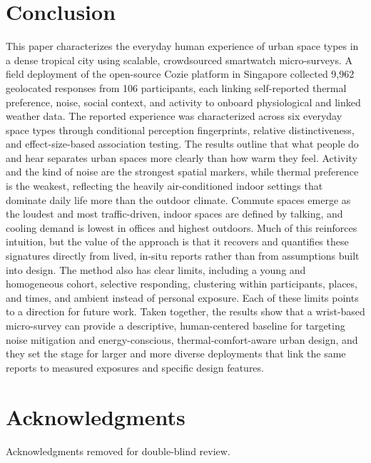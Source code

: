\documentclass[]{interact}
\begin{document}
\section{Conclusion}\label{sec:conclusion}

This paper characterizes the everyday human experience of urban space types in a dense tropical city using scalable, crowdsourced smartwatch micro-surveys. 
A field deployment of the open-source Cozie platform in Singapore collected 9{,}962 geolocated responses from 106 participants, each linking self-reported thermal preference, noise, social context, and activity to onboard physiological and linked weather data. 
The reported experience was characterized across six everyday space types through conditional perception fingerprints, relative distinctiveness, and effect-size-based association testing.
The results outline that what people do and hear separates urban spaces more clearly than how warm they feel. 
Activity and the kind of noise are the strongest spatial markers, while thermal preference is the weakest, reflecting the heavily air-conditioned indoor settings that dominate daily life more than the outdoor climate. 
Commute spaces emerge as the loudest and most traffic-driven, indoor spaces are defined by talking, and cooling demand is lowest in offices and highest outdoors.
Much of this reinforces intuition, but the value of the approach is that it recovers and quantifies these signatures directly from lived, in-situ reports rather than from assumptions built into design. 
The method also has clear limits, including a young and homogeneous cohort, selective responding, clustering within participants, places, and times, and ambient instead of personal exposure.
Each of these limits points to a direction for future work.
Taken together, the results show that a wrist-based micro-survey can provide a descriptive, human-centered baseline for targeting noise mitigation and energy-conscious, thermal-comfort-aware urban design, and they set the stage for larger and more diverse deployments that link the same reports to measured exposures and specific design features.

\section*{Acknowledgments}
Acknowledgments removed for double-blind review.
\end{document}
